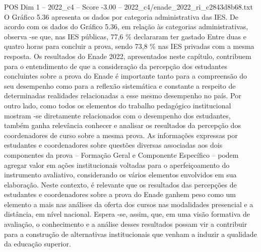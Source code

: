 \begin{textsample}{POS Dim 1 – 2022\_c4 – Score -3.00 – 2022\_c4/enade\_2022\_ri\_c2843d8b68.txt}
O Gráfico 5.36 apresenta os dados por categoria administrativa das IES.
De acordo com os dados do Gráfico 5.36, em relação às categorias administrativas, observa -se que, nas IES públicas, 77,6 \% declararam ter gastado Entre duas e quatro horas para concluir a prova, sendo 73,8 \% nas IES privadas com a mesma resposta.
Os resultados do Enade 2022, apresentados neste capítulo, contribuem para o entendimento de que a consideração da percepção dos estudantes concluintes sobre a prova do Enade é importante tanto para a compreensão do seu desempenho como para a reflexão sistemática e constante a respeito de determinadas realidades relacionadas a esse mesmo desempenho no país.
Por outro lado, como todos os elementos do trabalho pedagógico institucional mostram -se diretamente relacionados com o desempenho dos estudantes, também ganha relevância conhecer e analisar os resultados da percepção dos coordenadores de curso sobre a mesma prova.
As informações expressas por estudantes e coordenadores sobre questões diversas associadas aos dois componentes da prova – Formação Geral e Componente Específico – podem agregar valor em ações institucionais voltadas para o aperfeiçoamento do instrumento avaliativo, considerando os vários elementos envolvidos em sua elaboração.
Neste contexto, é relevante que os resultados das percepções de estudantes e coordenadores sobre a prova do Enade ganhem peso como um elemento a mais nas análises da oferta dos cursos nas modalidades presencial e a distância, em nível nacional.
Espera -se, assim, que, em uma visão formativa de avaliação, o conhecimento e a análise desses resultados possam vir a contribuir para a construção de alternativas institucionais que venham a induzir a qualidade da educação superior.

\end{textsample}
